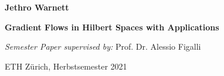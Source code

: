 \begin{titlepage}
	\begin{center}
		\vspace*{1cm}
		
		\large
		\textbf{Jethro Warnett}
		
		\vspace{1.5cm}
		
		\Huge{\textbf{Gradient Flows in Hilbert Spaces with Applications}}
		
		\vfill
		
		\large
		\textit{Semester Paper supervised by:} Prof. Dr. Alessio Figalli
		
		\vspace{0.8cm}
		
		ETH Zürich, Herbstsemester 2021
	\end{center}
\end{titlepage}